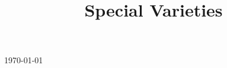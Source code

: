 

\title{Special Varieties}

\usepackage[sort=standard]{glossaries} 
\makeglossaries



\maketitle
\centerline{\today}
\tableofcontents







